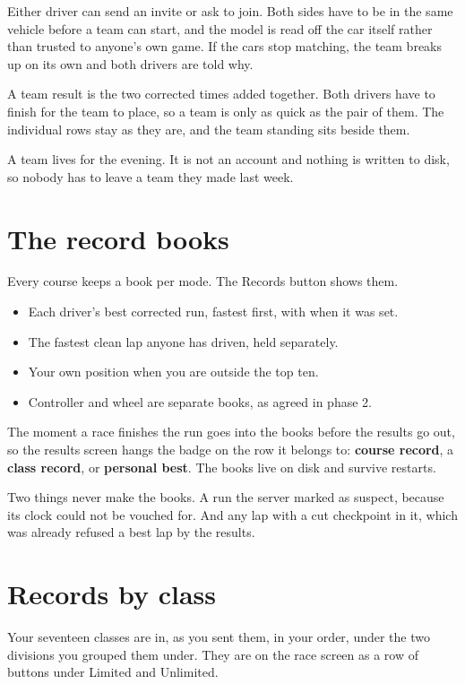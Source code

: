 \documentclass[11pt,a4paper]{article}
\begin{document}
Either driver can send an invite or ask to join. Both sides have to be in the
same vehicle before a team can start, and the model is read off the car itself
rather than trusted to anyone's own game. If the cars stop matching, the team
breaks up on its own and both drivers are told why.

A team result is the two corrected times added together. Both drivers have to
finish for the team to place, so a team is only as quick as the pair of them.
The individual rows stay as they are, and the team standing sits beside them.

A team lives for the evening. It is not an account and nothing is written to
disk, so nobody has to leave a team they made last week.

\section{The record books}

Every course keeps a book per mode. The Records button shows them.

\begin{itemize}
  \item Each driver's best corrected run, fastest first, with when it was set.
  \item The fastest clean lap anyone has driven, held separately.
  \item Your own position when you are outside the top ten.
  \item Controller and wheel are separate books, as agreed in phase 2.
\end{itemize}

The moment a race finishes the run goes into the books before the results go
out, so the results screen hangs the badge on the row it belongs to:
\textbf{course record}, a \textbf{class record}, or \textbf{personal best}.
The books live on disk and survive restarts.

Two things never make the books. A run the server marked as suspect, because
its clock could not be vouched for. And any lap with a cut checkpoint in it,
which was already refused a best lap by the results.

\section{Records by class}

Your seventeen classes are in, as you sent them, in your order, under the two
divisions you grouped them under. They are on the race screen as a row of
buttons under Limited and Unlimited.
\end{document}
